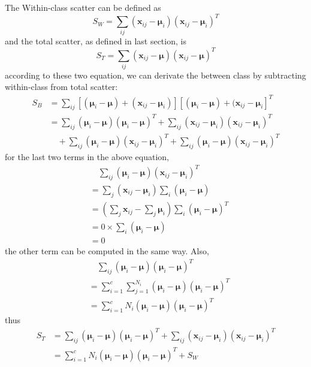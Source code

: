 \documentclass[conference]{IEEEtran}
\begin{document}
The Within-class scatter can be defined as
\begin{equation}
	S_W=\sum_{ij}(\bm{x}_{ij}-\bm{\mu}_i)(\bm{x}_{ij}-\bm{\mu}_i)^T
\end{equation}
and the total scatter, as defined in last section, is
\begin{equation}
	S_T=\sum_{ij}(\bm{x}_{ij}-\bm{\mu})(\bm{x}_{ij}-\bm{\mu})^T
\end{equation}
according to these two equation, we can derivate the between class by subtracting within-class from total scatter:
\begin{equation}
	\begin{split}
		S_B 
		& =\sum_{ij}[(\bm{\mu}_i-\bm{\mu})+(\bm{x}_{ij}-\bm{\mu}_i)][(\bm{\mu}_i-\bm{\mu})+(\bm{x}_{ij}-\bm{\mu}_i]^T \\
		& =\sum_{ij}(\bm{\mu}_i-\bm{\mu})(\bm{\mu}_i-\bm{\mu})^T+\sum_{ij}(\bm{x}_{ij}-\bm{\mu}_i)(\bm{x}_{ij}-\bm{\mu}_i)^T \\
		&
		\quad+\sum_{ij}(\bm{\mu}_i-\bm{\mu})(\bm{x}_{ij}-\bm{\mu}_i)^T+\sum_{ij}(\bm{\mu}_i-\bm{\mu})(\bm{x}_{ij}-\bm{\mu}_i)^T
	\end{split}
\end{equation}
for the last two terms in the above equation,
\begin{equation}
	\begin{split}
	&
	\quad\sum_{ij}(\bm{\mu}_i-\bm{\mu})(\bm{x}_{ij}-\bm{\mu}_i)^T \\
	&
	=\sum_{j}(\bm{x}_{ij}-\bm{\mu}_i)\sum_{i}(\bm{\mu}_i-\bm{\mu}) \\
	&
	=(\sum_{j}\bm{x}_{ij}-\sum_{j}\bm{\mu}_i)\sum_{i}(\bm{\mu}_i-\bm{\mu})^T \\
	&
	=0\times\sum_{i}(\bm{\mu}_i-\bm{\mu}) \\
	&=0
	\end{split}
\end{equation}
the other term can be computed in the same way. Also,
\begin{equation}
	\begin{split}
		&
		\quad\sum_{ij}(\bm{\mu}_i-\bm{\mu})(\bm{\mu}_i-\bm{\mu})^T \\
		&
		=\sum_{i=1}^{c}\sum_{j=1}^{N_i}(\bm{\mu}_i-\bm{\mu})(\bm{\mu}_i-\bm{\mu})^T \\
		&
		=\sum_{i=1}^{c}N_i(\bm{\mu}_i-\bm{\mu})(\bm{\mu}_i-\bm{\mu})^T
	\end{split}
\end{equation}
thus 
\begin{equation}
	\begin{split}
		S_T
		&
		=\sum_{ij}(\bm{\mu}_i-\bm{\mu})(\bm{\mu}_i-\bm{\mu})^T+\sum_{ij}(\bm{x}_{ij}-\bm{\mu}_i)(\bm{x}_{ij}-\bm{\mu}_i)^T \\
		&
		=\sum_{i=1}^{c}N_i(\bm{\mu}_i-\bm{\mu})(\bm{\mu}_i-\bm{\mu})^T+S_W
	\end{split}
\end{equation}
\end{document}

